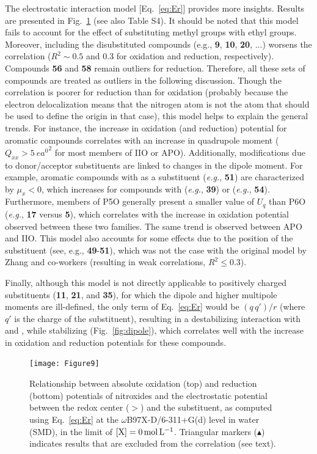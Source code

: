 \documentclass[review,preprint]{elsarticle}
\begin{document}
The electrostatic interaction model [Eq.~\eqref{eq:Er}] provides more insights. Results are presented in Fig.~\ref{fig:corr} (see also Table S4). It should be noted that this model fails to account for the effect of substituting methyl groups with ethyl groups. Moreover, including the disubstituted compounds (e.g., \textbf{9}, \textbf{10}, \textbf{20}, ...) worsens the correlation ($R^2 \sim 0.5$ and 0.3 for oxidation and reduction, respectively). Compounds \textbf{56} and \textbf{58} remain outliers for reduction. Therefore, all these sets of compounds are treated as outliers in the following discussion.
Though the correlation is poorer for reduction than for oxidation (probably because the electron delocalization means that the nitrogen atom is not the atom that should be used to define the origin in that case), this model helps to explain the general trends. For instance, the increase in oxidation (and reduction) potential for aromatic compounds correlates with an increase in quadrupole moment ($Q_{xx} > \SI{5}{\elementarycharge\bohr\squared}$ for most members of IIO or APO). Additionally, modifications due to donor/acceptor substituents are linked to changes in the dipole moment. For example, aromatic compounds with  as a substituent (\textit{e.g.}, \textbf{51}) are characterized by $\mu_{x} < 0$, which increases for compounds with  (\textit{e.g.}, \textbf{39}) or  (\textit{e.g.}, \textbf{54}). Furthermore, members of P5O generally present a smaller value of $U_q$ than P6O (\textit{e.g.}, \textbf{17} versus \textbf{5}), which correlates with the increase in oxidation potential observed between these two families. The same trend is observed between APO and IIO.
This model also accounts for some effects due to the position of the substituent (see, e.g., \textbf{49}-\textbf{51}), which was not the case with the original model by Zhang and co-workers (resulting in weak correlations, $R^2 \leq 0.3$). 

Finally, although this model is not directly applicable to positively charged substituents (\textbf{11}, \textbf{21}, and \textbf{35}), for which the dipole and higher multipole moments are ill-defined, the only term of Eq.~\eqref{eq:Er}  would be $(q\,q')/r$ (where $q'$ is the charge of the substituent), resulting in a destabilizing interaction with  and , while stabilizing  (Fig.~\ref{fig:dipole}), which correlates well with the increase in oxidation and reduction potentials for these compounds.


\begin{figure}[!h]
	\centering
	\texttt{[image: Figure9]}
	\caption{Relationship between absolute oxidation (top) and reduction (bottom) potentials of nitroxides and the electrostatic potential between the redox center ($>$) and the substituent, as computed using Eq.~\eqref{eq:Er} at the $\omega$B97X-D/6-311+G(d) level in water (SMD), in the limit of $[\ce{X}]=\SI{0}{\mole\per\liter}$. Triangular markers ($\blacktriangle$) indicates results that are excluded from the correlation (see text).}
	\label{fig:corr} 
\end{figure}
\end{document}
